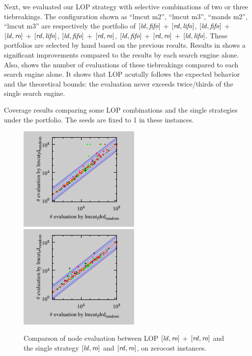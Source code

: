 Next, we evaluated our LOP
strategy with selective combinations of two or three tiebreakings.
The configuration shown as ``lmcut m2'', ``lmcut m3'', ``mands m2'',
``lmcut m3'' are respectively the portfolio of
$[\mbox{\textit{ld}},\mbox{\textit{fifo}}]$ + $[\mbox{\textit{rd}},\mbox{\textit{lifo}}]$, $[\mbox{\textit{ld}},\mbox{\textit{fifo}}]$ + $[\mbox{\textit{ld}},\mbox{\textit{ro}}]$ + $[\mbox{\textit{rd}},\mbox{\textit{lifo}}]$,
$[\mbox{\textit{ld}},\mbox{\textit{fifo}}]$ + $[\mbox{\textit{rd}},\mbox{\textit{ro}}]$, $[\mbox{\textit{ld}},\mbox{\textit{fifo}}]$ + $[\mbox{\textit{rd}},\mbox{\textit{ro}}]$ + $[\mbox{\textit{ld}},\mbox{\textit{lifo}}]$. These
portfolios are selected by hand based on the previous results.
Results in 
shows a significant improvements compared to the results by each search
engine alone.
% 
Also,  shows the number of evaluations of these
tiebreakings compared to each search engine alone.  It shows that
LOP acutally follows the expected behavior and the theoretical
bounds: the evaluation never exceeds twice/thirds of the single
search engine.

\begin{table}[tb]
 \centering {}
 
 \caption{Coverage results comparing some LOP combinations and the
 single strategies under the portfolio. The seeds are fixed to 1 in these instances.}
 \label{portfolio-coverage}
\end{table}


\begin{figure}[tb]
 \centering
 \includegraphics{tables/aaai16-multi-ldrd/zerocost/evaluated-nokey-lmcut_ldrd_random-lmcut_ld_random.pdf}
 \includegraphics{tables/aaai16-multi-ldrd/zerocost/evaluated-nokey-lmcut_ldrd_random-lmcut_rd_random.pdf}
 \caption{Comparson of node evaluation between LOP $[\mbox{\textit{ld}},\mbox{\textit{ro}}]$ +
 $[\mbox{\textit{rd}},\mbox{\textit{ro}}]$ and the single strategy $[\mbox{\textit{ld}},\mbox{\textit{ro}}]$ and $[\mbox{\textit{rd}},\mbox{\textit{ro}}]$, on
 zerocost instances.}  \label{portfolio-runtime}
\end{figure}


